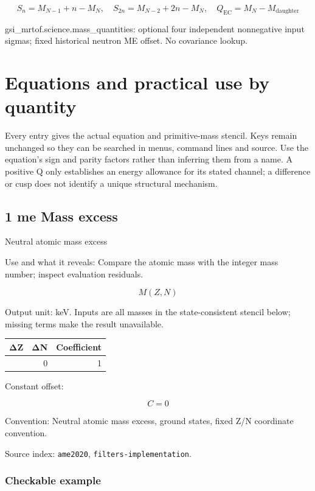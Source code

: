 \documentclass[
  11pt,
  letterpaper,
]{article}
\begin{document}
\[
S_n=M_{N-1}+n-M_N,\quad S_{2n}=M_{N-2}+2n-M_N,\quad Q_{\mathrm{EC}}=M_N-M_{\mathrm{daughter}}
\]

gsi\_mrtof.science.mass\_quantities: optional four independent
nonnegative input sigmas; fixed historical neutron ME offset. No
covariance lookup.

\section{Equations and practical use by
quantity}\label{equations-and-practical-use-by-quantity}

Every entry gives the actual equation and primitive-mass stencil. Keys
remain unchanged so they can be searched in menus, command lines and
source. Use the equation's sign and parity factors rather than inferring
them from a name. A positive Q only establishes an energy allowance for
its stated channel; a difference or cusp does not identify a unique
structural mechanism.

\subsection{1 me Mass excess}\label{me-mass-excess}

Neutral atomic mass excess

Use and what it reveals: Compare the atomic mass with the integer mass
number; inspect evaluation residuals.

\[
M(Z,N)
\]

Output unit: keV. Inputs are all masses in the state-consistent stencil
below; missing terms make the result unavailable.

\begin{longtable}[]{@{}rrr@{}}
\toprule\noalign{}
ΔZ & ΔN & Coefficient \\
\midrule\noalign{}
\endhead
\bottomrule\noalign{}
\endlastfoot
0 & 0 & 1 \\
\end{longtable}

Constant offset:

\[
C=0
\]

Convention: Neutral atomic mass excess, ground states, fixed Z/N
coordinate convention.

Source index: \texttt{ame2020}, \texttt{filters-implementation}.

\subsubsection{Checkable example}\label{checkable-example}
\end{document}
